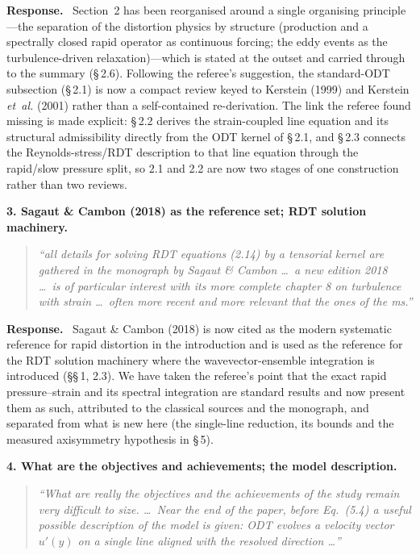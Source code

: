 \documentclass[11pt]{article}
\newenvironment{refcomment}%
  {\begin{quote}\color{commentgray}\itshape}%
  {\end{quote}}
\newcommand{\response}{\medskip\noindent\textbf{Response.}\ }
\newcommand{\point}[1]{\bigskip\noindent\textbf{#1}}
\begin{document}
\response
Section~2 has been reorganised around a single organising principle---the
separation of the distortion physics by structure (production and a
spectrally closed rapid operator as continuous forcing; the eddy events as
the turbulence-driven relaxation)---which is stated at the outset and
carried through to the summary (\S\,2.6). Following the referee's
suggestion, the standard-ODT subsection (\S\,2.1) is now a compact review
keyed to Kerstein (1999) and Kerstein \textit{et~al.} (2001) rather than a
self-contained re-derivation. The link the referee found missing is made
explicit: \S\,2.2 derives the strain-coupled line equation and its
structural admissibility directly from the ODT kernel of \S\,2.1, and
\S\,2.3 connects the Reynolds-stress/RDT description to that line equation
through the rapid/slow pressure split, so 2.1 and 2.2 are now two stages of
one construction rather than two reviews.

\point{3. Sagaut \& Cambon (2018) as the reference set; RDT solution
machinery.}
\begin{refcomment}
``all details for solving RDT equations (2.14) by a tensorial kernel are
gathered in the monograph by Sagaut \& Cambon \ldots\ a new edition 2018
\ldots\ is of particular interest with its more complete chapter 8 on
turbulence with strain \ldots\ often more recent and more relevant that the
ones of the ms.''
\end{refcomment}

\response
Sagaut \& Cambon (2018) is now cited as the modern systematic reference for
rapid distortion in the introduction and is used as the reference for the
RDT solution machinery where the wavevector-ensemble integration is
introduced (\S\S\,1, 2.3). We have taken the referee's point that the exact
rapid pressure--strain and its spectral integration are standard results
and now present them as such, attributed to the classical sources and the
monograph, and separated from what is new here (the single-line reduction,
its bounds and the measured axisymmetry hypothesis in \S\,5).

\point{4. What are the objectives and achievements; the model description.}
\begin{refcomment}
``What are really the objectives and the achievements of the study remain
very difficult to size. \ldots\ Near the end of the paper, before Eq.\
(5.4) a useful possible description of the model is given: ODT evolves a
velocity vector $u'(y)$ on a single line aligned with the resolved
direction \ldots''
\end{refcomment}
\end{document}
